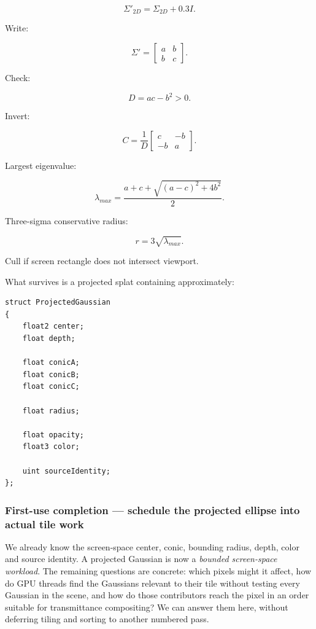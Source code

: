 \[
\boxed{
\Sigma'_{2D}
=
\Sigma_{2D}
+
0.3I.
}
\]

Write:

\[
\Sigma'=
\begin{bmatrix}
a&b\\
b&c
\end{bmatrix}.
\]

Check:

\[
\boxed{
D=ac-b^2>0.
}
\]

Invert:

\[
\boxed{
C=
\frac1D
\begin{bmatrix}
c&-b\\
-b&a
\end{bmatrix}.
}
\]

Largest eigenvalue:

\[
\boxed{
\lambda_{max}
=
\frac{
a+c+
\sqrt{(a-c)^2+4b^2}
}{
2
}.
}
\]

Three-sigma conservative radius:

\[
\boxed{
r=
3\sqrt{\lambda_{max}}.
}
\]

Cull if screen rectangle does not intersect viewport.

What survives is a projected splat containing approximately:

\protect{}\label{d8pb5g}%
\begin{verbatim}
struct ProjectedGaussian
{
    float2 center;
    float depth;

    float conicA;
    float conicB;
    float conicC;

    float radius;

    float opacity;
    float3 color;

    uint sourceIdentity;
};
\end{verbatim}

\subsubsection{First-use completion --- schedule the projected ellipse into actual tile work}\label{04-visual-computing-ii-ch038-first-use-completion-schedule-the-projected-ellipse-into-actual-tile-work}

\hypertarget{04-visual-computing-ii-ch038-first-use-completion-schedule-the-projected-ellipse-into-actual-tile-work}{}

We already know the screen-space center, conic, bounding radius, depth, color and source identity. A projected Gaussian is now a \emph{bounded screen-space workload}. The remaining questions are concrete: which pixels might it affect, how do GPU threads find the Gaussians relevant to their tile without testing every Gaussian in the scene, and how do those contributors reach the pixel in an order suitable for transmittance compositing? We can answer them here, without deferring tiling and sorting to another numbered pass.

